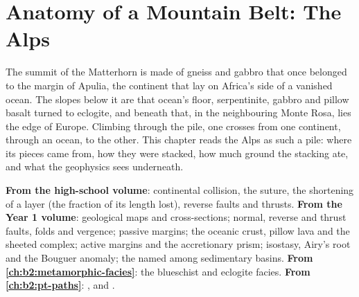 \chapter{Anatomy of a Mountain Belt: The Alps}\label{ch:b2:alpine-orogen}

The summit of the Matterhorn is made of gneiss and gabbro that once belonged to the margin
of Apulia, the continent that lay on Africa's side of a vanished ocean. The slopes below
it are that ocean's floor, serpentinite, gabbro and pillow basalt turned to eclogite, and
beneath that, in the neighbouring Monte Rosa, lies the edge of Europe. Climbing through the
pile, one crosses from one continent, through an ocean, to the other. This chapter reads the Alps as such a pile: where its pieces came from, how they were
stacked, how much ground the stacking ate, and what the geophysics sees underneath.

\begin{recall}
\textbf{From the high-school volume}: continental collision, the suture, the shortening of a
layer (the fraction of its length lost), reverse faults and thrusts. \textbf{From the Year 1
volume}: geological maps and cross-sections; normal, reverse and thrust faults, folds and
vergence; passive margins; the oceanic crust, pillow lava and the sheeted  complex;
active margins and the accretionary prism; isostasy, Airy's root and the Bouguer anomaly;
the  named among sedimentary basins. \textbf{From
\cref{ch:b2:metamorphic-facies}}: the blueschist and eclogite facies. \textbf{From
\cref{ch:b2:pt-paths}}: ,  and .
\end{recall}

